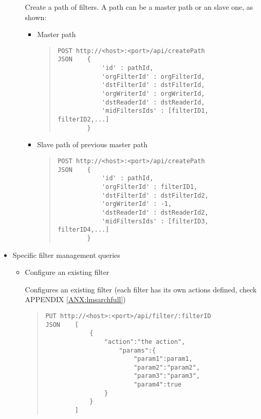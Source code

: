 \begin{itemize}
\begin{itemize}
Create a path of filters. A path can be a master path or an slave one, as shown:

\begin{itemize}

\item Master path
\begin{quote}
\begin{verbatim}
POST http://<host>:<port>/api/createPath
JSON    { 
            'id' : pathId, 
            'orgFilterId' : orgFilterId, 
            'dstFilterId' : dstFilterId, 
            'orgWriterId' : orgWriterId, 
            'dstReaderId' : dstReaderId, 
            'midFiltersIds' : [filterID1, filterID2,...] 
        }
\end{verbatim}
\end{quote}
\item Slave path of previous master path
\begin{quote}
\begin{verbatim}
POST http://<host>:<port>/api/createPath
JSON    { 
            'id' : pathId, 
            'orgFilterId' : filterID1, 
            'dstFilterId' : dstFilterId2, 
            'orgWriterId' : -1, 
            'dstReaderId' : dstReaderId2, 
            'midFiltersIds' : [filterID3, filterID4,...] 
        }  
\end{verbatim}
\end{quote}
\end{itemize}
\end{itemize}
\item Specific filter management queries        
\begin{itemize}
\item Configure an existing filter \hfill

Configures an existing filter (each filter has its own actions defined, check APPENDIX \ref{ANX:lmsarchfull})
\begin{quote}
\begin{verbatim}
PUT http://<host>:<port>/api/filter/:filterID
JSON    [
            {
                "action":"the action",
                    "params":{
                        "param1":param1,
                        "param2":"param2",
                        "param3":"param3",
                        "param4":true
                }
            }
        ]
\end{verbatim}
\end{quote}

\end{itemize}
\end{itemize}

